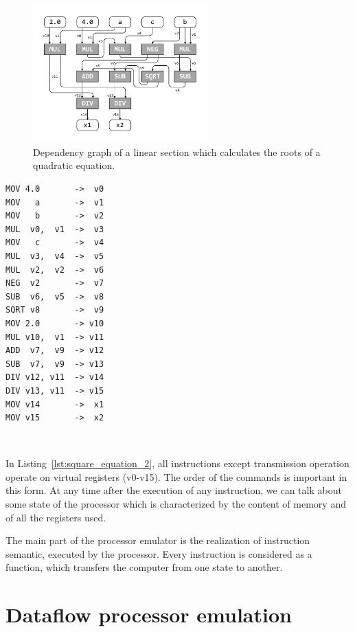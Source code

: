 \documentclass[
11pt,%
tightenlines,%
twoside,%
onecolumn,%
nofloats,%
nobibnotes,%
nofootinbib,%
superscriptaddress,%
noshowpacs,%
centertags]%
{revtex4}
\begin{document}
\begin{figure}[h]
\setcaptionmargin{5mm}
\onelinecaptionsfalse %
\includegraphics[width=0.60\textwidth]{pics/def_use.pdf}
\caption{Dependency graph of a linear section which calculates the roots of a quadratic equation.}\label{fig:def_use}
\end{figure}

\begin{lstlisting}[caption={Pseudocode for calculating the roots of  quadratic equation.},label={lst:square_equation_2}]
MOV 4.0       ->  v0
MOV   a       ->  v1
MOV   b       ->  v2
MUL  v0,  v1  ->  v3
MOV   c       ->  v4
MUL  v3,  v4  ->  v5
MUL  v2,  v2  ->  v6
NEG  v2       ->  v7
SUB  v6,  v5  ->  v8
SQRT v8       ->  v9
MOV 2.0       -> v10
MUL v10,  v1  -> v11
ADD  v7,  v9  -> v12
SUB  v7,  v9  -> v13
DIV v12, v11  -> v14
DIV v13, v11  -> v15
MOV v14       ->  x1
MOV v15       ->  x2
\end{lstlisting}

\

In Listing~\ref{lst:square_equation_2}, all instructions except transmission operation operate on virtual registers (v0-v15).
The order of the commands is important in this form.
At any time after the execution of any instruction, we can talk about some state of the processor which is characterized by the content of memory and of all the registers used.

The main part of the processor emulator is the realization of instruction semantic, executed by the processor.
Every instruction is considered as a function, which transfers the computer from one state to another.

\section{Dataflow processor emulation}
\end{document}
